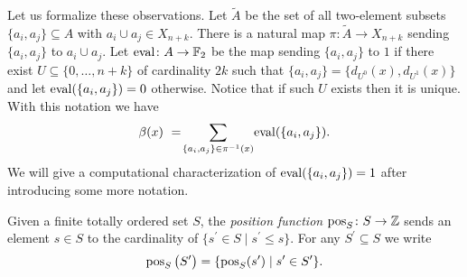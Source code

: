 Let us formalize these observations.
Let $\widetilde{A}$ be the set of all two-element subsets $\{a_i, a_j\} \subseteq A$ with $a_i \cup a_j \in X_{n+k}$.
There is a natural map $\pi \colon \widetilde{A} \to X_{n+k}$ sending $\{a_i, a_j\}$ to $a_i \cup a_j$.
Let $\operatorname{eval} \colon A \to {\mathbb{F}_2}$ be the map sending $\{a_i, a_j\}$ to $1$ if there exist $U \subseteq \{0, \dots, n+k\}$ of cardinality $2k$ such that $\{a_i, a_j\} = \{d_{U^0}(x), d_{U^1}(x)\}$ and let $\operatorname{eval}(\{a_i, a_j\}) = 0$ otherwise.
Notice that if such $U$ exists then it is unique.
With this notation we have
\begin{equation*}
\beta(x) \ = \! \sum_{\{a_i, a_j\} \in \pi^{-1}(x)} \! \operatorname{eval}(\{a_i, a_j\}).
\end{equation*}
We will give a computational characterization of $\operatorname{eval}(\{a_i, a_j\}) = 1$ after introducing some more notation.

Given a finite totally ordered set $S$, the \textit{position function} $\operatorname{pos}_S \colon S \to \mathbb{Z}$ sends an element $s \in S$ to the cardinality of $\{s^\prime \in S \mid s^\prime \leq s\}$.
For any $S^\prime \subseteq S$ we write
\[
\operatorname{pos}_{S} \big( S^\prime \big) =
\{\operatorname{pos}_{S} (s^\prime) \mid s^\prime \in S^\prime\}.
\]

